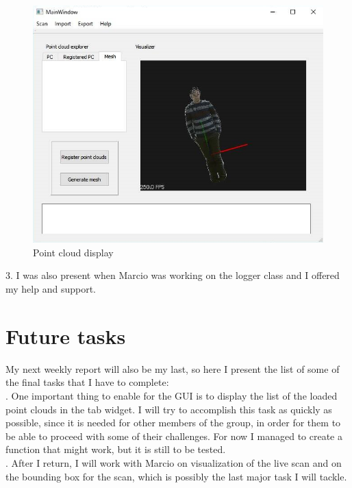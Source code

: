 \documentclass[aps,letterpaper,11pt]{revtex4}
\begin{document}
\begin{figure}[!htb]
  \includegraphics[scale=0.5]{mainwindow.png}
  \caption{Point cloud display}
  \label{fig:Kinect2}
\end{figure}


3. I was also present when Marcio was working on the logger class and I offered my help and support.\\
\pagebreak

\section {Future tasks}
My next weekly report will also be my last, so here I present the list of some of the final tasks that I have to complete:\\
. One important thing to enable for the GUI is to display the list of the loaded point clouds in the tab widget. I will try to accomplish this task as quickly as possible, since it is needed for other members of the group, in order for them to be able to proceed with some of their challenges. For now I managed to create a function that might work, but it is still to be tested.\\
. After I return, I will work with Marcio on visualization of the live scan and on the bounding box for the scan, which is possibly the last major task I will tackle.\\
\end{document}
